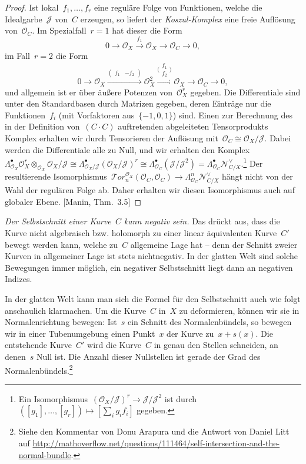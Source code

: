\documentclass[a4paper,ngerman,12pt]{scrartcl}
\theoremstyle{definition}
\theoremstyle{plain}
\theoremstyle{remark}
\newcommand{\N}{\mathcal{N}}
\newcommand{\J}{\mathcal{J}}
\renewcommand{\O}{\mathcal{O}}
\newcommand{\lra}{\longrightarrow}
\begin{document}
\begin{proof}Ist lokal~$f_1,\ldots,f_r$ eine reguläre Folge von
Funktionen, welche die Idealgarbe~$\J$ von~$C$ erzeugen, so liefert der
\emph{Koszul-Komplex} eine freie Auflösung von~$\O_C$. Im Spezialfall~$r = 1$
hat dieser die Form
\[ 0 \lra \O_X \stackrel{f_1} \lra \O_X \lra \O_C \lra 0, \]
im Fall~$r = 2$ die Form
\[ 0 \lra \O_X \stackrel{(\begin{smallmatrix}f_1&-f_2\end{smallmatrix})} \lra \O_X^2
  \stackrel{\bigl(\begin{smallmatrix}f_1\\f_2\end{smallmatrix}\bigr)}{\lra} \O_X \lra \O_C \lra 0,
  \]
und allgemein ist er über äußere Potenzen von~$\O_X^r$ gegeben. Die Differentiale
sind unter den Standardbasen durch Matrizen gegeben, deren Einträge nur
die Funktionen~$f_i$ (mit Vorfaktoren aus~$\{-1,0,1\}$) sind. Einen zur
Berechnung des in der Definition von~$(C \cdot C)$ auftretenden abgeleiteten
Tensorprodukts Komplex erhalten wir durch Tensorieren der Auflösung mit~$\O_C
\cong \O_X/\J$. Dabei werden die Differentiale alle zu Null, und wir erhalten
den Komplex~$\Lambda^\bullet_{\O_X} \O_X^r \otimes_{\O_X} \O_X/\J \cong
\Lambda^\bullet_{\O_X/\J} (\O_X/\J)^r \cong
\Lambda^\bullet_{\O_C}(\J/\J^2) = \Lambda^\bullet_{\O_C}
\N_{C/X}^\vee$.\footnote{Ein Isomorphismus~$(\O_X/\J)^r \to \J/\J^2$ ist
durch~$([g_1],\ldots,[g_r]) \mapsto [\sum_i g_i f_i]$ gegeben.}
Der resultierende Isomorphismus~$\mathcal{T}\!or^{\O_X}_n(\O_C,\O_C) \to \Lambda^n_{\O_C}
\N_{C/X}^\vee$ hängt nicht von der Wahl der regulären Folge ab. Daher erhalten
wir diesen Isomorphismus auch auf globaler Ebene. [Manin, Thm.~3.5]
\end{proof}

\emph{Der Selbstschnitt einer Kurve~$C$ kann negativ sein.} Das drückt aus, dass
die Kurve nicht algebraisch bzw. holomorph zu einer linear äquivalenten
Kurve~$C'$ bewegt werden kann, welche zu~$C$ allgemeine Lage hat -- denn der
Schnitt zweier Kurven in allgemeiner Lage ist stets nichtnegativ. In der
glatten Welt sind solche Bewegungen immer möglich, ein negativer Selbstschnitt
liegt dann an negativen Indizes.

In der glatten Welt kann man sich die Formel für den Selbstschnitt auch wie
folgt anschaulich klarmachen. Um die Kurve~$C$ in~$X$ zu deformieren, können
wir sie in Normalenrichtung bewegen: Ist~$s$ ein Schnitt des Normalenbündels,
so bewegen wir in einer Tubenumgebung einen Punkt~$x$ der Kurve zu~$x + s(x)$.
Die entstehende Kurve~$C'$ wird die Kurve~$C$ in genau den Stellen schneiden,
an denen~$s$ Null ist. Die Anzahl dieser Nullstellen ist gerade der Grad des
Normalenbündels.\footnote{Siehe den Kommentar von Donu Arapura und die Antwort
von Daniel Litt auf
\url{http://mathoverflow.net/questions/111464/self-intersection-and-the-normal-bundle}.}
\end{document}
